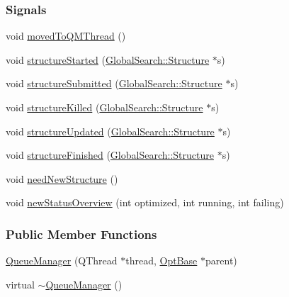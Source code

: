 \subsubsection*{Signals}
\begin{DoxyCompactItemize}
\item 
void \hyperlink{classGlobalSearch_1_1QueueManager_a1453d56d967bc6ddaaca951c5a7d8c8f}{moved\+To\+Q\+M\+Thread} ()
\item 
void \hyperlink{classGlobalSearch_1_1QueueManager_a4309c24054c4752705f1d66d08358c9f}{structure\+Started} (\hyperlink{classGlobalSearch_1_1Structure}{Global\+Search\+::\+Structure} $\ast$s)
\item 
void \hyperlink{classGlobalSearch_1_1QueueManager_a97ce1e692cd752d62ebea8b2c56e1cd2}{structure\+Submitted} (\hyperlink{classGlobalSearch_1_1Structure}{Global\+Search\+::\+Structure} $\ast$s)
\item 
void \hyperlink{classGlobalSearch_1_1QueueManager_ad6e65416801d0cad4086fafb03990273}{structure\+Killed} (\hyperlink{classGlobalSearch_1_1Structure}{Global\+Search\+::\+Structure} $\ast$s)
\item 
void \hyperlink{classGlobalSearch_1_1QueueManager_aaf98cf54afb9751e185a5450c32f4595}{structure\+Updated} (\hyperlink{classGlobalSearch_1_1Structure}{Global\+Search\+::\+Structure} $\ast$s)
\item 
void \hyperlink{classGlobalSearch_1_1QueueManager_a9ce76b6d4be1aaa3e1f04724f9baa03a}{structure\+Finished} (\hyperlink{classGlobalSearch_1_1Structure}{Global\+Search\+::\+Structure} $\ast$s)
\item 
void \hyperlink{classGlobalSearch_1_1QueueManager_a4b50dbd51e53b1d0d5cb93e9d7380c1c}{need\+New\+Structure} ()
\item 
void \hyperlink{classGlobalSearch_1_1QueueManager_af37eb7a9e54e347a81dc3a1e373c8d54}{new\+Status\+Overview} (int optimized, int running, int failing)
\end{DoxyCompactItemize}
\subsubsection*{Public Member Functions}
\begin{DoxyCompactItemize}
\item 
\hyperlink{classGlobalSearch_1_1QueueManager_a41ab0186ccec173fe9400368ca2573be}{Queue\+Manager} (Q\+Thread $\ast$thread, \hyperlink{classGlobalSearch_1_1OptBase}{Opt\+Base} $\ast$parent)
\item 
virtual \hyperlink{classGlobalSearch_1_1QueueManager_a6eb307bcd037cd493d81dee2eeb87a52}{$\sim$\+Queue\+Manager} ()
\end{DoxyCompactItemize}
